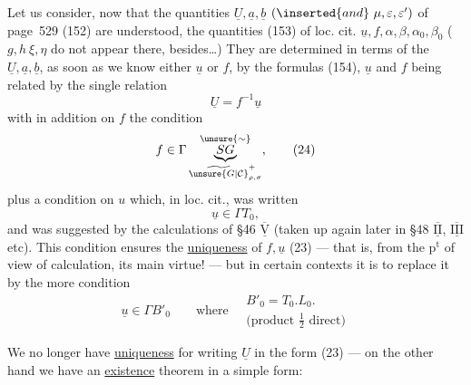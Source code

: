 

Let us consider, now that the quantities $\underline U,\underline a,\underline b$ $(\inserted{and}\ \mu,\varepsilon,\varepsilon')$ of page~529 (152) are understood, the quantities (153) of loc. cit. $\underline u,f,\alpha,\beta,\alpha_0,\beta_0$ ($g,h\ \xi,\eta$ do not appear there, besides\ldots) They are determined in terms of the $\underline U,\underline a,\underline b$, as soon as we know either $\underline u$ or $f$, by the formulas (154), $\underline u$ and $f$ being related by the single relation
\[
\underline U=f^{-1}\underline u \tag{23}
\]
with in addition on $f$ the condition
\[
f\in\Gamma\underbrace{SG}_{\widetilde{\unsure{G|\mathcal C}}_{\rho,\sigma}^{+}}^{\unsure{\sim}},\tag{24}
\]
plus a condition on $u$ which, in loc. cit., was written
\[
\underline u\in\Gamma T_0,\tag{25}
\]
and was suggested by the calculations of \S46 $\overline{\underline{\mathrm V}}$ (taken up again later in \S48 $\overline{\underline{\mathrm{II}}}$, $\overline{\underline{\mathrm{III}}}$ etc). This condition ensures the \uline{uniqueness} of $f,\underline u$  (23) --- that is, from the $\mathrm p^{\mathrm t}$ of view of calculation, its main virtue! --- but in certain contexts it is  to replace it by the more  condition
\[
\underline u\in\Gamma B'_0
\qquad\text{where}\quad
\begin{gathered}
B'_0=T_0.L_0.\\
\text{(product }\tfrac12\text{ direct)}
\end{gathered}\tag{26}
\]



We no longer have  \uline{uniqueness} for writing $\underline U$ in the form (23) --- on the other hand we have an \uline{existence} theorem in a simple form:

